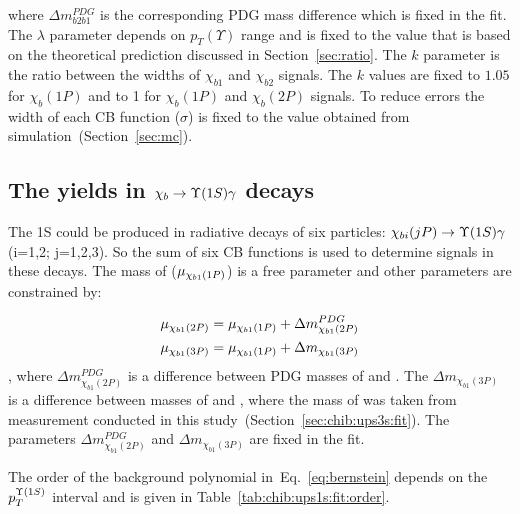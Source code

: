 \noindent where $\Delta m_{b2b1}^{PDG}$ is the corresponding PDG mass difference which
is fixed in the fit. The $\lambda$ parameter depends on $p_T(\Upsilon)$ range
and is fixed to the value that is based on the theoretical prediction discussed
in Section~\ref{sec:ratio}. The $k$ parameter is the ratio between the widths of
$\chi_{b1}$ and $\chi_{b2}$ signals. The $k$ values are fixed to $1.05$ for
$\chi_b(1P)$  and to 1 for $\chi_b(1P)$ and $\chi_b(2P)$ signals. To reduce
errors the width of each CB function ($\sigma$) is fixed to the value obtained
from simulation~(Section~\ref{sec:mc}).

\subsection{The \texorpdfstring{\chib}{xb} yields in
	\texorpdfstring{$\chib \to \Y1S \gamma$}{chib -> Y(1S) gamma} decays}
\label{sec:chib:ups1s:fit}

The \Y1S could be produced in radiative decays of six \chib particles:
$\chi_{bi}(jP) \to \Y1S \gamma$ (i=1,2; j=1,2,3). So the sum of six CB functions
is used to determine \chib signals in these decays. The mass of \chiboneOneP
($\mu_{\chi_{b 1}(1P)}$) is a free parameter and  other parameters are constrained 
by:

\begin{equation}
  \begin{aligned}
\mu_{\chi_{b 1}(2P)} = \mu_{\chi_{b 1}(1P)} + \Delta m_{\chi_{b1}(2P)}^{PDG} \\
\mu_{\chi_{b 1}(3P)} = \mu_{\chi_{b 1}(1P)} + \Delta m_{\chi_{b1}(3P)} \\
  \end{aligned}
\end{equation}
, where $\Delta m_{\chi_{b1}(2P)}^{PDG}$ is a difference between PDG masses of
\chiboneTwoP and \chiboneOneP. The $\Delta  m_{\chi_{b1}(3P)}$ is a difference
between masses of \chiboneThreeP and \chiboneOneP, where the mass of
\chiboneThreeP was taken from measurement conducted in this
study~(Section~\ref{sec:chib:ups3s:fit}). The parameters  $\Delta
m_{\chi_{b1}(2P)}^{PDG}$ and $\Delta  m_{\chi_{b1}(3P)}$ are fixed in the fit.

The order of the background polynomial in~Eq.~\ref{eq:bernstein} depends on the
$p_{T}^{\OneS}$ interval and is given in Table~\ref{tab:chib:ups1s:fit:order}.



